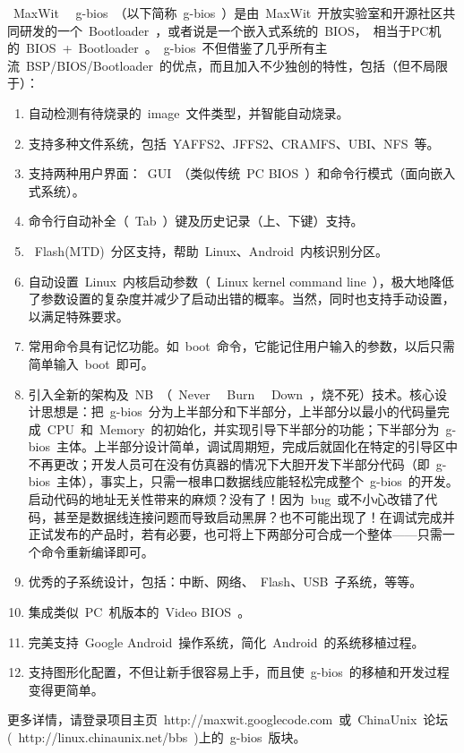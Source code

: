 \documentclass[a4paper,11pt]{book}
\begin{document}
~MaxWit~ ~g-bios~（以下简称~g-bios~）是由~MaxWit~开放实验室和开源社区共同研发的一个~Bootloader~，或者说是一个嵌入式系统的~BIOS，~相当于PC机的~BIOS~+~Bootloader~。~g-bios~不但借鉴了几乎所有主流~BSP/BIOS/Bootloader~的优点，而且加入不少独创的特性，包括（但不局限于）：
\begin{enumerate}\setlength{\itemsep}{-\itemsep}
\item 自动检测有待烧录的~image~文件类型，并智能自动烧录。
\item 支持多种文件系统，包括~YAFFS2、JFFS2、CRAMFS、UBI、NFS~等。
\item 支持两种用户界面：~GUI~（类似传统~PC BIOS~）和命令行模式（面向嵌入式系统）。
\item 命令行自动补全（~Tab~）键及历史记录（上、下键）支持。
\item ~Flash(MTD)~分区支持，帮助~Linux、Android~内核识别分区。
\item 自动设置~Linux~内核启动参数（~Linux kernel command line~），极大地降低了参数设置的复杂度并减少了启动出错的概率。当然，同时也支持手动设置，以满足特殊要求。
\item 常用命令具有记忆功能。如~boot~命令，它能记住用户输入的参数，以后只需简单输入~boot~即可。
\item 引入全新的架构及~NB~（~Never~ ~Burn~ ~Down~，烧不死）技术。核心设计思想是：把~g-bios~分为上半部分和下半部分，上半部分以最小的代码量完成~CPU~和~Memory~的初始化，并实现引导下半部分的功能；下半部分为~g-bios~主体。上半部分设计简单，调试周期短，完成后就固化在特定的引导区中不再更改；开发人员可在没有仿真器的情况下大胆开发下半部分代码（即~g-bios~主体），事实上，只需一根串口数据线应能轻松完成整个~g-bios~的开发。启动代码的地址无关性带来的麻烦？没有了！因为~bug~或不小心改错了代码，甚至是数据线连接问题而导致启动黑屏？也不可能出现了！在调试完成并正试发布的产品时，若有必要，也可将上下两部分可合成一个整体——只需一个命令重新编译即可。
\item 优秀的子系统设计，包括：中断、网络、~Flash、USB~子系统，等等。
\item 集成类似~PC~机版本的~Video BIOS~。
\item 完美支持~Google Android~操作系统，简化~Android~的系统移植过程。
\item 支持图形化配置，不但让新手很容易上手，而且使~g-bios~的移植和开发过程变得更简单。
\end{enumerate}
更多详情，请登录项目主页~http://maxwit.googlecode.com~或~ChinaUnix~论坛(~http://linux.chinaunix.net/bbs~)上的~g-bios~版块。
\end{document}
